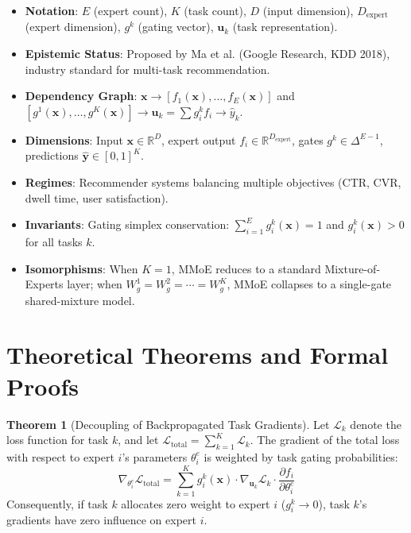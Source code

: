 \documentclass[11pt,a4paper]{article}
\theoremstyle{definition}
\newtheorem{theorem}{\textbf{Theorem}}[section]
\begin{document}
\begin{itemize}
    \item \textbf{Notation}: $E$ (expert count), $K$ (task count), $D$ (input dimension), $D_{\text{expert}}$ (expert dimension), $g^k$ (gating vector), $\mathbf{u}_k$ (task representation).
    \item \textbf{Epistemic Status}: Proposed by Ma et al. (Google Research, KDD 2018), industry standard for multi-task recommendation.
    \item \textbf{Dependency Graph}: $\mathbf{x} \to [f_1(\mathbf{x}), \dots, f_E(\mathbf{x})]$ and $[g^1(\mathbf{x}), \dots, g^K(\mathbf{x})] \to \mathbf{u}_k = \sum g_i^k f_i \to \widehat{y}_k$.
    \item \textbf{Dimensions}: Input $\mathbf{x} \in \mathbb{R}^D$, expert output $f_i \in \mathbb{R}^{D_{\text{expert}}}$, gates $g^k \in \Delta^{E-1}$, predictions $\widehat{\mathbf{y}} \in [0, 1]^K$.
    \item \textbf{Regimes}: Recommender systems balancing multiple objectives (CTR, CVR, dwell time, user satisfaction).
    \item \textbf{Invariants}: Gating simplex conservation: $\sum_{i=1}^E g_i^k(\mathbf{x}) = 1$ and $g_i^k(\mathbf{x}) > 0$ for all tasks $k$.
    \item \textbf{Isomorphisms}: When $K=1$, MMoE reduces to a standard Mixture-of-Experts layer; when $W_g^1 = W_g^2 = \cdots = W_g^K$, MMoE collapses to a single-gate shared-mixture model.
\end{itemize}

\section{Theoretical Theorems and Formal Proofs}

\begin{theorem}[Decoupling of Backpropagated Task Gradients]
Let $\mathcal{L}_k$ denote the loss function for task $k$, and let $\mathcal{L}_{\text{total}} = \sum_{k=1}^K \mathcal{L}_k$. The gradient of the total loss with respect to expert $i$'s parameters $\theta_i^e$ is weighted by task gating probabilities:
{\boldmath
\begin{equation}
\nabla_{\theta_i^e} \mathcal{L}_{\text{total}} = \sum_{k=1}^K g_i^k(\mathbf{x}) \cdot \nabla_{\mathbf{u}_k} \mathcal{L}_k \cdot \frac{\partial f_i}{\partial \theta_i^e}
\end{equation}
}
Consequently, if task $k$ allocates zero weight to expert $i$ ($g_i^k \to 0$), task $k$'s gradients have zero influence on expert $i$.
\end{theorem}
\end{document}
